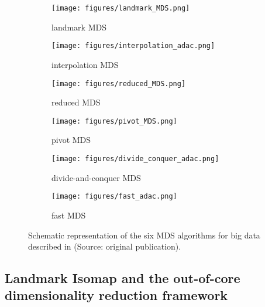 \begin{figure}
    \centering
    \captionsetup[subfigure]{labelformat=empty}

    \begin{subfigure}[t]{0.3\textwidth}
        \centering
        \texttt{[image: figures/landmark\_MDS.png]}
        \caption{landmark MDS}
        \label{fig:landmark_MDS}
    \end{subfigure}
    \hfill
    \begin{subfigure}[t]{0.3\textwidth}
        \centering
        \texttt{[image: figures/interpolation\_adac.png]}
        \caption{interpolation MDS}
        \label{fig:interpolation_MDS}
    \end{subfigure}
    \hfill
    \begin{subfigure}[t]{0.3\textwidth}
        \centering
        \texttt{[image: figures/reduced\_MDS.png]}
        \caption{reduced MDS}
        \label{fig:reduced_MDS}
    \end{subfigure}

    \begin{subfigure}[t]{0.3\textwidth}
        \centering
        \texttt{[image: figures/pivot\_MDS.png]}
        \caption{pivot MDS}
        \label{fig:pivot_MDS}
    \end{subfigure}
    \hfill
    \begin{subfigure}[t]{0.3\textwidth}
        \centering
        \texttt{[image: figures/divide\_conquer\_adac.png]}
        \caption{divide-and-conquer MDS}
        \label{fig:divide_conquer_MDS}
    \end{subfigure}
    \hfill
    \begin{subfigure}[t]{0.3\textwidth}
        \centering
        \texttt{[image: figures/fast\_adac.png]}
        \caption{fast MDS}
        \label{fig:fast_MDS}
    \end{subfigure}
    
    \caption{Schematic representation of the six MDS algorithms for big data described in \cite{Delicado2024} (Source: original publication).}
    \label{fig:bigmds}
\end{figure}

\subsection{Landmark Isomap and the out-of-core dimensionality reduction framework}
\label{sec:landmark-Isomap-OOC-DR-framework}

